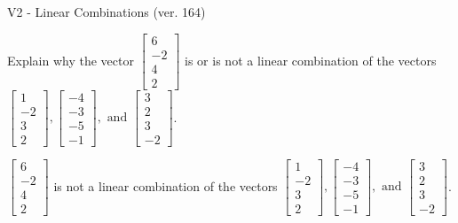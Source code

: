 \begin{exercise}
  \begin{exerciseTitle}V2 - Linear Combinations (ver. 164)\end{exerciseTitle}
  \begin{exerciseStatement}
    Explain why the vector \(\left[\begin{array}{c}
6 \\
-2 \\
4 \\
2
\end{array}\right]\)  is or is not a linear 
	combination of the vectors \(\left[\begin{array}{c}
1 \\
-2 \\
3 \\
2
\end{array}\right] , \left[\begin{array}{c}
-4 \\
-3 \\
-5 \\
-1
\end{array}\right] , \text{ and } \left[\begin{array}{c}
3 \\
2 \\
3 \\
-2
\end{array}\right]\).
	


  \end{exerciseStatement}
  \begin{exerciseAnswer}
   \(\left[\begin{array}{c}
6 \\
-2 \\
4 \\
2
\end{array}\right]\) 
  	 is not  
	a linear combination of the vectors \(\left[\begin{array}{c}
1 \\
-2 \\
3 \\
2
\end{array}\right] , \left[\begin{array}{c}
-4 \\
-3 \\
-5 \\
-1
\end{array}\right] , \text{ and } \left[\begin{array}{c}
3 \\
2 \\
3 \\
-2
\end{array}\right]\).

	
  


  \end{exerciseAnswer}
\end{exercise}